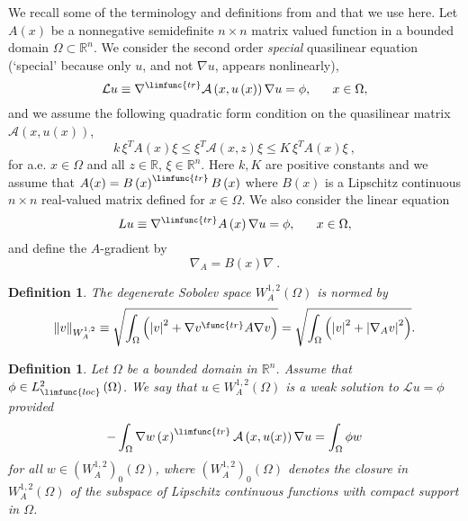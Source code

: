 \documentclass{amsart}
\theoremstyle{plain}
\newtheorem{definition}[theorem]{Definition}
\numberwithin{equation}{section}
\begin{document}
We recall some of the terminology and definitions from \cite{KoRiSaSh1} and 
\cite{KoRiSaSh2} that we use here. Let $A\left( x\right) $ be a nonnegative
semidefinite $n\times n$ matrix valued function in a bounded domain $\Omega
\subset \mathbb{R}^{n}$. We consider the second order \emph{special}
quasilinear equation (`special' because only $u$, and not $\nabla u$,
appears nonlinearly),%
\begin{equation*}
\mathcal{L}u\equiv \nabla ^{\limfunc{tr}}\mathcal{A}\left( x,u\left(
x\right) \right) \nabla u=\phi ,\ \ \ \ \ x\in \Omega ,
\end{equation*}%
and we assume the following quadratic form condition on the quasilinear
matrix $\mathcal{A}(x,u(x))$, 
\begin{equation}
k\,\xi ^{T}A(x)\xi \leq \xi ^{T}\mathcal{A}(x,z)\xi \leq K\,\xi ^{T}A(x)\xi
\ ,  \label{struc_0}
\end{equation}%
for a.e. $x\in \Omega $ and all $z\in \mathbb{R}$, $\xi \in \mathbb{R}^{n}$.
Here $k,K$ are positive constants and we assume that $A(x)=B\left( x\right)
^{\limfunc{tr}}B\left( x\right) $ where $B\left( x\right) $ is a Lipschitz
continuous $n\times n$ real-valued matrix defined for $x\in \Omega $. We
also consider the linear equation%
\begin{equation*}
Lu\equiv \nabla ^{\limfunc{tr}}A\left( x\right) \nabla u=\phi ,\ \ \ \ \
x\in \Omega ,
\end{equation*}%
and define the $A$-gradient by%
\begin{equation}
\nabla _{A}=B\left( x\right) \nabla \ .  \label{def A grad}
\end{equation}

\begin{definition}
	The degenerate Sobolev space $W_{A}^{1,2}\left( \Omega \right) $ is normed by%
	\begin{equation*}
	\left\Vert v\right\Vert _{W_{A}^{1,2}}\equiv \sqrt{\int_{\Omega }\left(
		\left\vert v\right\vert ^{2}+\nabla v^{\func{tr}}A\nabla v\right) }=\sqrt{%
		\int_{\Omega }\left( \left\vert v\right\vert ^{2}+\left\vert \nabla
		_{A}v\right\vert ^{2}\right) }.
	\end{equation*}
\end{definition}

\begin{definition}
	Let $\Omega $ be a bounded domain in $\mathbb{R}^{n}$. Assume that $\phi \in
	L_{\limfunc{loc}}^{2}\left( \Omega \right) $. We say that $u\in
	W_{A}^{1,2}\left( \Omega \right) $ is a \emph{weak solution} to $\mathcal{L}%
	u=\phi $ provided%
	\begin{equation*}
	-\int_{\Omega }\nabla w\left( x\right) ^{\limfunc{tr}}\mathcal{A}\left(
	x,u(x)\right) \nabla u=\int_{\Omega }\phi w
	\end{equation*}%
	for all $w\in \left( W_{A}^{1,2}\right) _{0}\left( \Omega \right) $, where $%
	\left( W_{A}^{1,2}\right) _{0}\left( \Omega \right) $ denotes the closure in 
	$W_{A}^{1,2}\left( \Omega \right) $ of the subspace of Lipschitz continuous
	functions with compact support in $\Omega $.
\end{definition}
\end{document}
